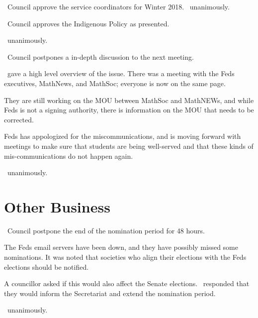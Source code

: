 \begin{motion}
    \birt\ Council approve the service coordinators for Winter 2018. 
    \movers{\jill}{\seneca}
    \carries\ unanimously.
\end{motion}

\begin{motion}
    \birt\ Council approves the Indigenous Policy as presented.
    \movers{\andrewc}{\seneca}

    \carries\ unanimously.
\end{motion}

\begin{motion}
    \birt\ Council postpones a in-depth discussion to the next meeting.
    \movers{\andrewc}{\seneca}

    \jill\ gave a high level overview of the issue. There was a meeting with
    the Feds executives, MathNews, and MathSoc; everyone is now on the same
    page. 
    
    They are still working on the MOU between MathSoc and MathNEWs, and 
    while Feds is not a signing authority, there is information on the MOU that
    needs to be corrected. 
    
    Feds has appologized for the miscommunications, and is moving forward with
    meetings to make sure that students are being well-served and that 
    these kinds of mis-communications do not happen again.
    
    \carries\ unanimously.
\end{motion}

\section*{Other Business}

\begin{motion}
    \birt\ Council postpone the end of the nomination period for 48 hours. 
    \movers{\antonio}{\seneca}

    The Feds email servers have been down, and they have possibly missed some
    nominations. It was noted that societies who align their elections with the
    Feds elections should be notified. 

    A councillor asked if this would also affect the Senate elections. \pres\
    responded that they would inform the Secretariat and extend the nomination
    period. 

    \carries\ unanimously.
\end{motion}

